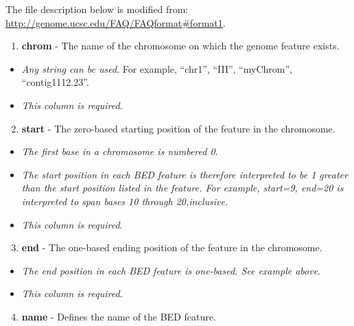 \documentclass[letterpaper,10pt,english]{sphinxmanual}
\begin{document}
The file description below is modified from: \href{http://genome.ucsc.edu/FAQ/FAQformat\#format1}{http://genome.ucsc.edu/FAQ/FAQformat\#format1}.
\begin{enumerate}
\item {} 
\textbf{chrom} - The name of the chromosome on which the genome feature exists.

\end{enumerate}
\begin{itemize}
\item {} 
\emph{Any string can be used}. For example, ``chr1'', ``III'', ``myChrom'', ``contig1112.23''.

\item {} 
\emph{This column is required}.

\end{itemize}
\begin{enumerate}
\setcounter{enumi}{1}
\item {} 
\textbf{start} - The zero-based starting position of the feature in the chromosome.

\end{enumerate}
\begin{itemize}
\item {} 
\emph{The first base in a chromosome is numbered 0}.

\item {} 
\emph{The start position in each BED feature is therefore interpreted to be 1 greater than the start position listed in the feature. For example, start=9, end=20 is interpreted to span bases 10 through 20,inclusive}.

\item {} 
\emph{This column is required}.

\end{itemize}
\begin{enumerate}
\setcounter{enumi}{2}
\item {} 
\textbf{end} - The one-based ending position of the feature in the chromosome.

\end{enumerate}
\begin{itemize}
\item {} 
\emph{The end position in each BED feature is one-based. See example above}.

\item {} 
\emph{This column is required}.

\end{itemize}
\begin{enumerate}
\setcounter{enumi}{3}
\item {} 
\textbf{name} - Defines the name of the BED feature.

\end{enumerate}
\end{document}
